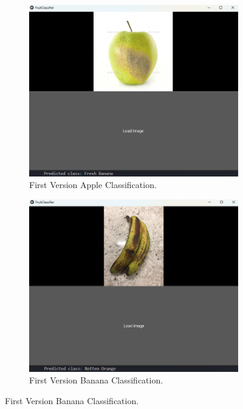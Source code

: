 \documentclass[conference]{IEEEtran}
\begin{document}
\begin{figure}[h]
\begin{subfigure}[b]{0.48\linewidth}
        \label{figFB}
    \end{subfigure}
    \hfill
    \begin{subfigure}[b]{0.48\linewidth}
        \centering
        \includegraphics[width=\linewidth]{1layer appelR3.png}
        \caption{First Version Apple Classification.}
        \label{figFB}
    \end{subfigure}
    \hfill
    \begin{subfigure}[b]{0.48\linewidth}
        \centering
        \includegraphics[width=\linewidth]{1layer bananaR1.png}
        \caption{First Version Banana Classification.}

\end{subfigure}
\end{figure}
\end{document}
